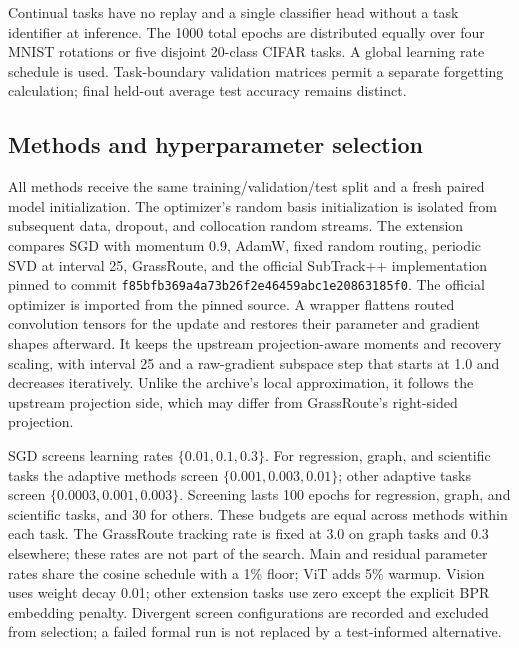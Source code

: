 Continual tasks have no replay and a single classifier head without a task
identifier at inference. The 1000 total epochs are distributed equally over
four MNIST rotations or five disjoint 20-class CIFAR tasks. A global learning
rate schedule is used. Task-boundary validation matrices permit a separate
forgetting calculation; final held-out average test accuracy remains distinct.

\subsection{Methods and hyperparameter selection}
All methods receive the same training/validation/test split and a fresh paired
model initialization. The optimizer's random basis initialization is isolated
from subsequent data, dropout, and collocation random streams. The extension
compares SGD with momentum 0.9, AdamW, fixed random routing, periodic SVD at
interval 25, GrassRoute, and the official SubTrack++ implementation pinned to
commit \texttt{f85bfb369a4a73b26f2e46459abc1e20863185f0}.
The official optimizer is imported from the pinned source. A wrapper
flattens routed convolution tensors for the update and restores their
parameter and gradient shapes afterward. It keeps the upstream
projection-aware moments and recovery scaling, with interval 25 and a
raw-gradient subspace step that starts at 1.0 and decreases iteratively.
Unlike the archive's local approximation, it follows the upstream projection
side, which may differ from GrassRoute's right-sided projection.

SGD screens learning rates $\{0.01,0.1,0.3\}$. For regression, graph, and
scientific tasks the adaptive methods screen $\{0.001,0.003,0.01\}$;
other adaptive tasks screen $\{0.0003,0.001,0.003\}$. Screening lasts 100
epochs for regression, graph, and scientific tasks, and 30 for others.
These budgets are equal across methods within each task. The GrassRoute
tracking rate is fixed at 3.0 on graph tasks and 0.3 elsewhere; these rates
are not part of the search. Main and residual parameter rates
share the cosine schedule with a 1\% floor; ViT adds 5\% warmup. Vision
uses weight decay 0.01; other extension tasks use zero except the explicit
BPR embedding penalty. Divergent screen configurations are recorded and
excluded from selection; a failed formal run is not replaced by a
test-informed alternative.

